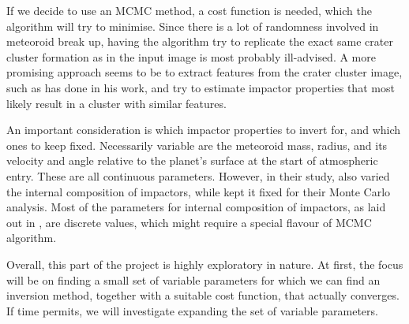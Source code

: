 If we decide to use an MCMC method, a cost function is needed, which the algorithm will try to minimise.
Since there is a lot of randomness involved in meteoroid break up, having the algorithm try to replicate the exact same crater cluster formation as in the input image is most probably ill-advised.
A more promising approach seems to be to extract features from the crater cluster image, such as \cite{newland2019CFM18} has done in his work, and try to estimate impactor properties that most likely result in a cluster with similar features.

An important consideration is which impactor properties to invert for, and which ones to keep fixed.
Necessarily variable are the meteoroid mass, radius, and its velocity and angle relative to the planet's surface at the start of atmospheric entry. These are all continuous parameters.
However, in their study, \cite{wheeler2018atmospheric} also varied the internal composition of impactors, while \cite{newland2019CFM18} 
kept it fixed for their Monte Carlo analysis.
Most of the parameters for internal composition of impactors, as laid out in \cite{wheeler2018atmospheric}, are discrete values, which might require a special flavour of MCMC algorithm.

Overall, this part of the project is highly exploratory in nature. At first, the focus will be on finding a small set of variable parameters for which we can find an inversion method, together with a suitable cost function, that actually converges. If time permits, we will investigate expanding the set of variable parameters.


